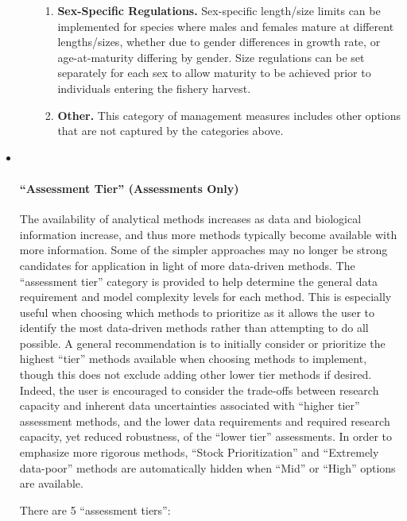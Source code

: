 \documentclass[
  11pt,
]{book}
\begin{document}
\begin{itemize}
\begin{itemize}
\begin{enumerate}
    \item
      \textbf{Sex-Specific Regulations.} Sex-specific length/size limits can be implemented for species where males and females mature at different lengths/sizes, whether due to gender differences in growth rate, or age-at-maturity differing by gender. Size regulations can be set separately for each sex to allow maturity to be achieved prior to individuals entering the fishery harvest.
    \item
      \textbf{Other.} This category of management measures includes other options that are not captured by the categories above.
    \end{enumerate}
  \end{itemize}
\item ~
  \hypertarget{assessment-tier-assessments-only}{%
  \paragraph{``Assessment Tier'' (Assessments Only)}\label{assessment-tier-assessments-only}}

  The availability of analytical methods increases as data and biological information increase, and thus more methods typically become available with more information. Some of the simpler approaches may no longer be strong candidates for application in light of more data-driven methods. The ``assessment tier'' category is provided to help determine the general data requirement and model complexity levels for each method. This is especially useful when choosing which methods to prioritize as it allows the user to identify the most data-driven methods rather than attempting to do all possible. A general recommendation is to initially consider or prioritize the highest ``tier'' methods available when choosing methods to implement, though this does not exclude adding other lower tier methods if desired. Indeed, the user is encouraged to consider the trade-offs between research capacity and inherent data uncertainties associated with ``higher tier'' assessment methods, and the lower data requirements and required research capacity, yet reduced robustness, of the ``lower tier'' assessments. In order to emphasize more rigorous methods, ``Stock Prioritization'' and ``Extremely data-poor'' methods are automatically hidden when ``Mid'' or ``High'' options are available.

  There are 5 ``assessment tiers'':


\end{itemize}
\end{document}
